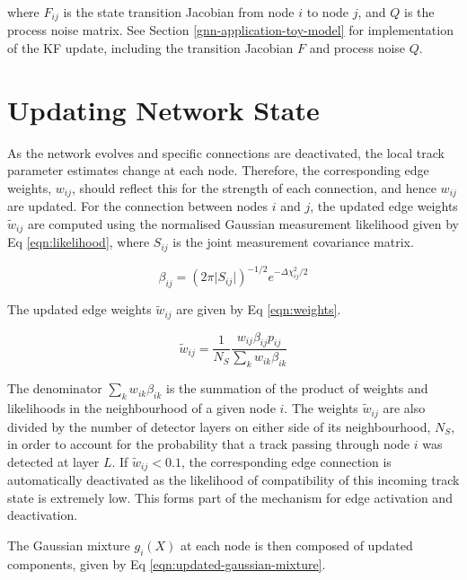 where $F_{ij}$ is the state transition Jacobian from node $i$ to node $j$, and $Q$ is the process noise matrix. See Section \ref{gnn-application-toy-model} for implementation of the KF update, including the transition Jacobian $F$ and process noise $Q$. 






\section{Updating Network State}
\label{gnn-updating-network-state}

As the network evolves and specific connections are deactivated, the local track parameter estimates change at each node. Therefore, the corresponding edge weights, $w_{ij}$, should reflect this for the strength of each connection, and hence $w_{ij}$ are updated. For the connection between nodes $i$ and $j$, the updated edge weights $\widetilde{w}_{ij}$ are computed using the normalised Gaussian measurement likelihood given by Eq \eqref{eqn:likelihood}, where $S_{ij}$ is the joint measurement covariance matrix.

\begin{equation}
\beta_{ij} = (2 \pi \lvert S_{ij} \rvert )^{-1/2}  e^{-\Delta \chi^{2}_{ij} / 2}
\label{eqn:likelihood}
\end{equation}


The updated edge weights $\widetilde{w}_{ij}$ are given by Eq \eqref{eqn:weights}. 

\begin{equation}
\widetilde{w}_{ij} = \frac{1}{N_S} \frac{w_{ij}\beta_{ij} p_{ij}}{\sum_{k}w_{ik}\beta_{ik}}
\label{eqn:weights}
\end{equation}


The denominator $\sum_{k}w_{ik}\beta_{ik}$ is the summation of the product of weights and likelihoods in the neighbourhood of a given node $i$. The weights $\widetilde{w}_{ij}$ are also divided by the number of detector layers on either side of its neighbourhood, $N_S$, in order to account for the probability that a track passing through node $i$ was detected at layer $L$. If $\widetilde{w}_{ij} < 0.1$, the corresponding edge connection is automatically deactivated as the likelihood of compatibility of this incoming track state is extremely low. This forms part of the mechanism for edge activation and deactivation.

The Gaussian mixture $g_i(X)$ at each node is then composed of updated components, given by Eq \eqref{eqn:updated-gaussian-mixture}.

